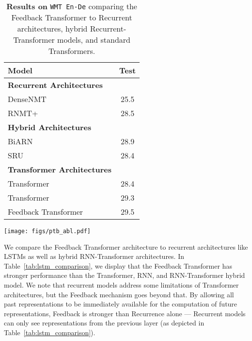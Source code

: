 \documentclass{article} \usepackage{iclr2021_conference}
\begin{document}
\begin{table}
	\begin{minipage}{.45\textwidth}
	\setlength{\tabcolsep}{4pt}
	    \centering
	    \begin{tabular}{l@{}c}
	    \toprule
	    Model & Test\\
	    \midrule
	    \textbf{Recurrent Architectures} & \\ 
	    DenseNMT~\small{\cite{shen2018dense}} & 25.5 \\ 
	    RNMT+~\small{\citep{chen2018best}} & 28.5 \\
	    \midrule 
	    \textbf{Hybrid Architectures} & \\ 
	    BiARN~\small{\citep{hao2019modeling}}  & 28.9 \\
	    SRU~\small{\citep{lei2017simple}} & 28.4 \\ 
	    \midrule 
	    \textbf{Transformer Architectures} & \\ 
	    Transformer~\small{\citep{vaswani2017attention}} & 28.4 \\ 
	    Transformer~\small{\citep{ott2018scaling}} & 29.3 \\
	    Feedback Transformer & 29.5 \\
	    \bottomrule
	    \end{tabular}
	    \caption{
	        \textbf{Results on} \texttt{WMT En-De} comparing the Feedback Transformer to Recurrent architectures, hybrid Recurrent-Transformer models, and standard Transformers.
		}
	    \label{tab:lstm_comparison}
	\end{minipage}
	\hfill
	\begin{minipage}{.50\textwidth}
		\centering
		\texttt{[image: figs/ptb\_abl.pdf]}
	    \label{fig:ptb_ablation}
	\end{minipage}
\end{table}

We compare the Feedback Transformer architecture to recurrent architectures like LSTMs as well as hybrid RNN-Transformer architectures. In Table~\ref{tab:lstm_comparison}, we display that the Feedback Transformer has stronger performance than the Transformer, RNN, and RNN-Transformer hybrid model. We note that recurrent models address some limitations of Transformer architectures, but the Feedback mechanism goes beyond that. By allowing all past representations to be immediately available for the computation of future representations, Feedback is stronger than Recurrence alone --- Recurrent models can only see representations from the previous layer (as depicted in Table~\ref{tab:lstm_comparison}).
\end{document}
